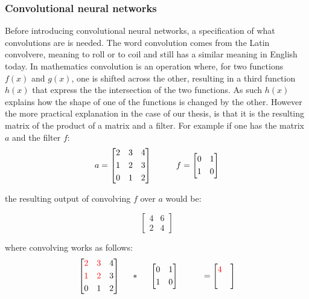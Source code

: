 \subsubsection{Convolutional neural networks}
Before introducing convolutional neural networks, a specification of what convolutions are is needed. The word convolution comes from the Latin convolvere, meaning to roll or to coil and still has a similar meaning in English today. In mathematics convolution is an operation where, for two functions $f(x)$ and $g(x)$, one is shifted across the other, resulting in a third function $h(x)$ that express the the intersection of the two functions. As such $h(x)$ explains how the shape of one of the functions is changed by the other. 
However the more practical explanation in the case of our thesis, is that it is the resulting matrix of the product of a matrix and a filter. For example if one has the matrix $a$ and the filter $f$:
\[
a = \begin{bmatrix}
       2 & 3 & 4           \\[0.3em]
       1 & 2 & 3 \\[0.3em]
       0 & 1 & 2
     \end{bmatrix}
\hspace*{1cm}
f = \begin{bmatrix}
       0 & 1 \\[0.3em]
       1 & 0        
     \end{bmatrix}     
\]

\noindent the resulting output of convolving $f$ over $a$ would be:

\[
\begin{bmatrix}
       4 & 6 \\[0.3em]
       2 & 4        
     \end{bmatrix}     
\]

where convolving works as follows:
\[
\begin{bmatrix}
       \textcolor{red}2 & \textcolor{red}3 & 4           \\[0.3em]
       \textcolor{red}1 & \textcolor{red}2 & 3 \\[0.3em]
       0 & 1 & 2
     \end{bmatrix}
\hspace*{0.5cm}
*
\hspace*{0.5cm}
\begin{bmatrix}
       0 & 1 \\[0.3em]
       1 & 0        
     \end{bmatrix}     
\hspace*{1cm}
 = \begin{bmatrix}
       \textcolor{red}4 &  \\[0.3em]
         &         
     \end{bmatrix}
\]

